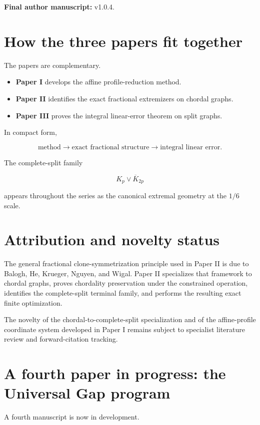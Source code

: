 \documentclass[11pt,a4paper]{article}
\begin{document}
\textbf{Final author manuscript:} v1.0.4.

\section{How the three papers fit together}

The papers are complementary.

\begin{itemize}
\item \textbf{Paper I} develops the affine profile-reduction method.
\item \textbf{Paper II} identifies the exact fractional extremizers on chordal graphs.
\item \textbf{Paper III} proves the integral linear-error theorem on split graphs.
\end{itemize}

In compact form,

\[
\boxed{
\text{method}
\longrightarrow
\text{exact fractional structure}
\longrightarrow
\text{integral linear error}.
}
\]

The complete-split family

\[
K_p\vee\overline K_{2p}
\]

appears throughout the series as the canonical extremal geometry at the \(1/6\) scale.

\section{Attribution and novelty status}

The general fractional clone-symmetrization principle used in Paper II is due to Balogh, He, Krueger, Nguyen, and Wigal. Paper II specializes that framework to chordal graphs, proves chordality preservation under the constrained operation, identifies the complete-split terminal family, and performs the resulting exact finite optimization.

The novelty of the chordal-to-complete-split specialization and of the affine-profile coordinate system developed in Paper I remains subject to specialist literature review and forward-citation tracking.

\section{A fourth paper in progress: the Universal Gap program}

A fourth manuscript is now in development.
\end{document}
